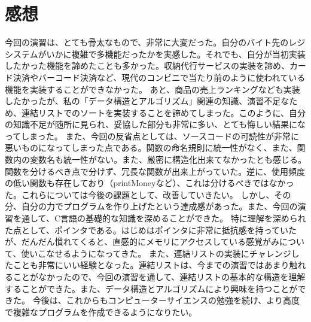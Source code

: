 \documentclass[a4j,11pt]{jarticle}
\begin{document}
\section{感想}
今回の演習は、とても骨太なもので、非常に大変だった。自分のバイト先のレジシステムがいかに複雑で多機能だったかを実感した。それでも、自分が当初実装したかった機能を諦めたことも多かった。収納代行サービスの実装を諦め、カード決済やバーコード決済など、現代のコンビニで当たり前のように使われている機能を実装することができなかった。
あと、商品の売上ランキングなども実装したかったが、私の「データ構造とアルゴリズム」関連の知識、演習不足なため、連結リストでのソートを実装することを諦めてしまった。このように、自分の知識不足が随所に見られ、妥協した部分も非常に多い、とても悔しい結果になってしまった。
また、今回の反省点としては、ソースコードの可読性が非常に悪いものになってしまった点である。関数の命名規則に統一性がなく、また、関数内の変数名も統一性がない。また、厳密に構造化出来てなかったとも感じる。関数を分けるべき点で分けず、冗長な関数が出来上がっていた。逆に、使用頻度の低い関数も存在しており（printMoneyなど）、これは分けるべきではなかった。これらについては今後の課題として、改善していきたい。
しかし、その分、自分の力でプログラムを作り上げたという達成感があった。また、今回の演習を通して、C言語の基礎的な知識を深めることができた。
特に理解を深められた点として、ポインタである。はじめはポインタに非常に抵抗感を持っていたが、だんだん慣れてくると、直感的にメモリにアクセスしている感覚がみについて、使いこなせるようになってきた。
また、連結リストの実装にチャレンジしたことも非常にいい経験となった。連結リストは、今までの演習ではあまり触れることがなかったので、今回の演習を通して、連結リストの基本的な構造を理解することができた。また、データ構造とアルゴリズムにより興味を持つことができた。
今後は、これからもコンピューターサイエンスの勉強を続け、より高度で複雑なプログラムを作成できるようになりたい。
\end{document}
